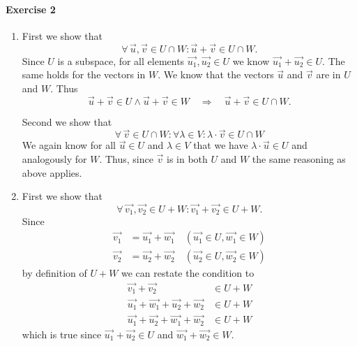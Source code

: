 \documentclass{article}
\begin{document}
\paragraph{Exercise 2}

\begin{enumerate}
    \item First we show that
    \begin{equation*}
        \forall\, \vec{u}, \vec{v} \in U \cap W : \vec{u} + \vec{v} \in U \cap W.
    \end{equation*}
    Since $U$ is a subspace, for all elements $\vec{u_1}, \vec{u_2} \in U$ we know $\vec{u_1} + \vec{u_2} \in U$. The same holds for the vectors in $W$. We know that the vectors $\vec{u}$ and $\vec{v}$ are in $U$ and $W$. Thus
    \begin{equation*}
        \vec{u} + \vec{v} \in U \land \vec{u} + \vec{v} \in W \quad\Longrightarrow\quad \vec{u} + \vec{v} \in U \cap W.
    \end{equation*}

    Second we show that
    \begin{equation*}
        \forall\, \vec{v} \in U \cap W : \forall \lambda \in V : \lambda \cdot \vec{v} \in U \cap W
    \end{equation*}
    We again know for all $\vec{u} \in U$ and $\lambda \in V$ that we have $\lambda \cdot \vec{u} \in U$ and analogously for $W$. Thus, since $\vec{v}$ is in both $U$ and $W$ the same reasoning as above applies.

    \item First we show that
    \begin{equation*}
        \forall\, \vec{v_1}, \vec{v_2} \in U + W : \vec{v_1} + \vec{v_2} \in U + W.    
    \end{equation*}
    Since
    \begin{align*}
        \vec{v_1} &= \vec{u_1} + \vec{w_1} \quad (\vec{u_1} \in U, \vec{w_1} \in W) \\
        \vec{v_2} &= \vec{u_2} + \vec{w_2} \quad (\vec{u_2} \in U, \vec{w_2} \in W)
    \end{align*}
    by definition of $U + W$ we can restate the condition to
    \begin{align*}
        \vec{v_1} + \vec{v_2} &\in U + W \\
        \vec{u_1} + \vec{w_1} + \vec{u_2} + \vec{w_2} &\in U + W \\
        \vec{u_1} + \vec{u_2} + \vec{w_1} + \vec{w_2} &\in U + W
    \end{align*}
    which is true since $\vec{u_1} + \vec{u_2} \in U$ and $\vec{w_1} + \vec{w_2} \in W$.


\end{enumerate}
\end{document}
